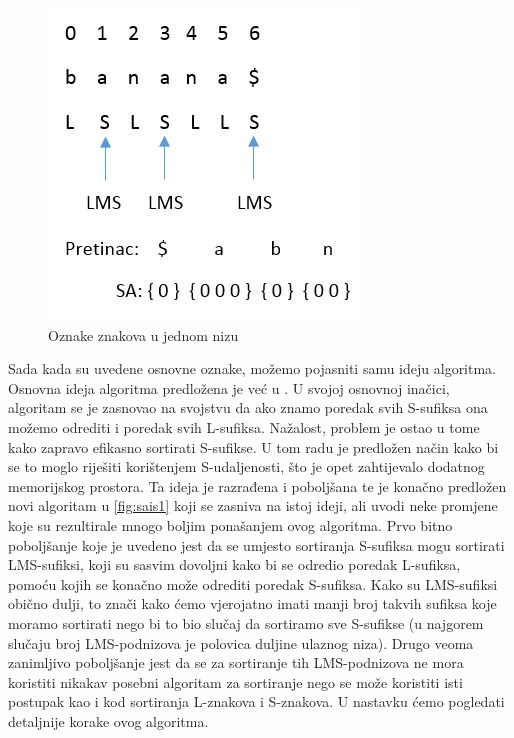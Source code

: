 \begin{figure}[h]
   \centering
       \includegraphics{./pictures/charactertypes.jpg}
 \caption{Oznake znakova u jednom nizu}
 \label{fig:oznake}
\end{figure}

Sada kada su uvedene osnovne oznake, možemo pojasniti samu ideju algoritma. Osnovna ideja algoritma predložena je već u \cite{ka}. U svojoj osnovnoj inačici, algoritam se je zasnovao na svojstvu da ako znamo poredak svih S-sufiksa ona možemo odrediti i poredak svih L-sufiksa. Nažalost, problem je ostao u tome kako zapravo efikasno sortirati S-sufikse. U tom radu je predložen način kako bi se to moglo riješiti korištenjem S-udaljenosti, što je opet zahtijevalo dodatnog memorijskog prostora. Ta ideja je razrađena i poboljšana te je konačno predložen novi algoritam u \ref{fig:sais1} koji se zasniva na istoj ideji, ali uvodi neke promjene koje su rezultirale mnogo boljim ponašanjem ovog algoritma. Prvo bitno poboljšanje koje je uvedeno jest da se umjesto sortiranja S-sufiksa mogu sortirati LMS-sufiksi, koji su sasvim dovoljni kako bi se odredio poredak L-sufiksa, pomoću kojih se konačno može odrediti poredak S-sufiksa. Kako su LMS-sufiksi obično dulji, to znači kako ćemo vjerojatno imati manji broj takvih sufiksa koje moramo sortirati nego bi to bio slučaj da sortiramo sve S-sufikse (u najgorem slučaju broj LMS-podnizova je polovica duljine ulaznog niza). Drugo veoma zanimljivo poboljšanje jest da se za sortiranje tih LMS-podnizova ne mora koristiti nikakav posebni algoritam za sortiranje nego se može koristiti isti postupak kao i kod sortiranja L-znakova i S-znakova. U nastavku ćemo pogledati detaljnije korake ovog algoritma. 

